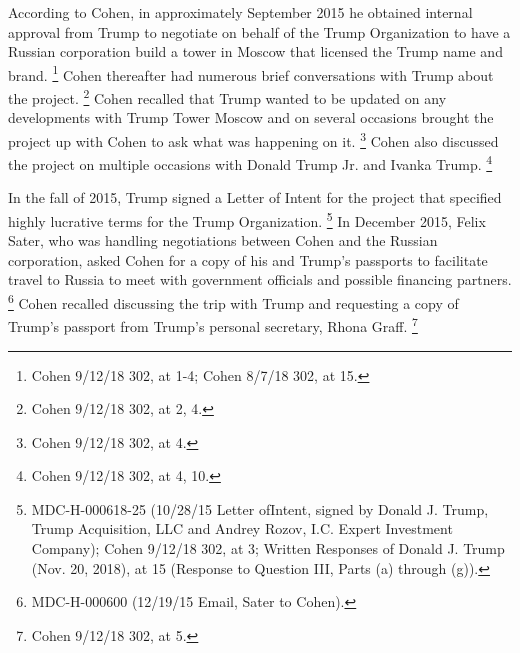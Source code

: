 According to Cohen, in approximately September 2015 he obtained internal approval from Trump to negotiate on behalf of the Trump Organization to have a Russian corporation build a tower in Moscow that licensed the Trump name and brand.%
\footnote{Cohen 9/12/18 302, at 1-4;
Cohen 8/7/18 302, at 15.}
Cohen thereafter had numerous brief conversations with Trump about the project.%
\footnote{Cohen 9/12/18 302, at 2, 4.}
Cohen recalled that Trump wanted to be updated on any developments with Trump Tower Moscow and on several occasions brought the project up with Cohen to ask what was happening on it.%
\footnote{Cohen 9/12/18 302, at 4.}
Cohen also discussed the project on multiple occasions with Donald Trump Jr. and Ivanka Trump.%
\footnote{Cohen 9/12/18 302, at 4, 10.}

In the fall of 2015, Trump signed a Letter of Intent for the project that specified highly lucrative terms for the Trump Organization.%
\footnote{MDC-H-000618-25 (10/28/15 Letter ofIntent, signed by Donald J. Trump, Trump Acquisition, LLC and Andrey Rozov, I.C. Expert Investment Company);
Cohen 9/12/18 302, at 3;
Written Responses of Donald J. Trump (Nov. 20, 2018), at 15 (Response to Question III, Parts (a) through (g)).}
In December 2015, Felix Sater, who was handling negotiations between Cohen and the Russian corporation, asked Cohen for a copy of his and Trump's passports to facilitate travel to Russia to meet with government officials and possible financing partners.%
\footnote{MDC-H-000600 (12/19/15 Email, Sater to Cohen).}
Cohen recalled discussing the trip with Trump and requesting a copy of Trump's passport from Trump's personal secretary, Rhona Graff.%
\footnote{Cohen 9/12/18 302, at 5.}

